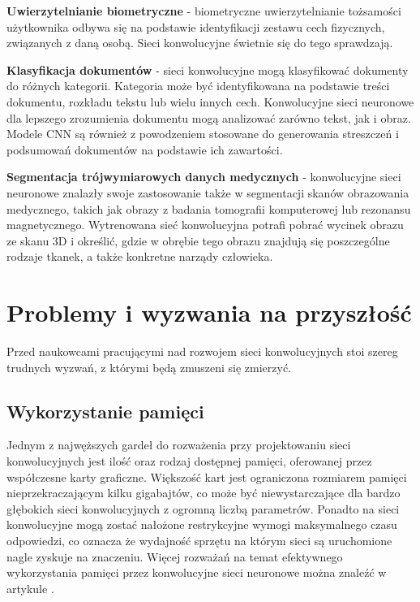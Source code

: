 \begin{enumerate*}
\item \textbf{Uwierzytelnianie biometryczne} - biometryczne uwierzytelnianie tożsamości użytkownika odbywa się na podstawie identyfikacji zestawu cech fizycznych, związanych z daną osobą. Sieci konwolucyjne świetnie się do tego sprawdzają. 
\item \textbf{Klasyfikacja dokumentów} - sieci konwolucyjne mogą klasyfikować dokumenty do różnych kategorii. Kategoria może być identyfikowana na podstawie treści dokumentu, rozkładu tekstu lub wielu innych cech. Konwolucyjne sieci neuronowe dla lepszego zrozumienia dokumentu mogą analizować zarówno tekst, jak i obraz. Modele CNN są również z powodzeniem stosowane do generowania streszczeń i podsumowań dokumentów na podstawie ich zawartości.
\item \textbf{Segmentacja trójwymiarowych danych medycznych} - konwolucyjne sieci neuronowe znalazły swoje zastosowanie także w segmentacji skanów obrazowania medycznego, takich jak obrazy z badania tomografii komputerowej lub rezonansu magnetycznego. Wytrenowana sieć konwolucyjna potrafi pobrać wycinek obrazu ze skanu 3D i określić, gdzie w obrębie tego obrazu znajdują się poszczególne rodzaje tkanek, a także konkretne narządy człowieka.
\end{enumerate*}

\section{Problemy i wyzwania na przyszłość}
Przed naukowcami pracującymi nad rozwojem sieci konwolucyjnych stoi szereg trudnych wyzwań, z którymi będą zmuszeni się zmierzyć.

\subsection{Wykorzystanie pamięci}
Jednym z najwęższych gardeł do rozważenia przy projektowaniu sieci konwolucyjnych jest ilość oraz rodzaj dostępnej pamięci, oferowanej przez współczesne karty graficzne. Większość kart jest ograniczona rozmiarem pamięci nieprzekraczającym kilku gigabajtów, co może być niewystarczające dla bardzo głębokich sieci konwolucyjnych z ogromną liczbą parametrów. Ponadto na sieci konwolucyjne mogą zostać nałożone restrykcyjne wymogi maksymalnego czasu odpowiedzi, co oznacza że wydajność sprzętu na którym sieci są uruchomione nagle zyskuje na znaczeniu. Więcej rozważań na temat efektywnego wykorzystania pamięci przez konwolucyjne sieci neuronowe można znaleźć w artykule \cite{cnn:memoryRequirements}.

